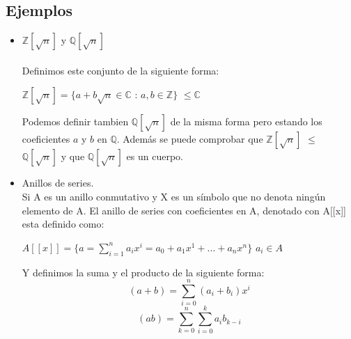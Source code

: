 \documentclass[11pt]{article}
\begin{document}
\subsection{Ejemplos}

\begin{itemize}
\item $\mathbb{Z}[\sqrt{n}]$ y $\mathbb{Q}[\sqrt{n}]$\\\\
Definimos este conjunto de la siguiente forma:\\
\begin{center}$\mathbb{Z}[\sqrt{n}] = \{a+b\sqrt{n} \in \mathbb{C}$ : $a,b \in \mathbb{Z} \}$ $\leq \mathbb{C}$\end{center}

Podemos definir tambien $\mathbb{Q}[\sqrt{n}]$ de la misma forma pero estando los coeficientes $a$ y $b$ en $\mathbb{Q}$. Además se puede comprobar que $\mathbb{Z}[\sqrt{n}]$ $\leq$ $\mathbb{Q}[\sqrt{n}]$ y que $\mathbb{Q}[\sqrt{n}]$ es un cuerpo.

\item Anillos de series.\\
Si A es un anillo conmutativo y X es un símbolo que no denota ningún elemento de A. El anillo de series con coeficientes en A, denotado con A[[x]] esta definido como:\begin{center}
$A[[x]] = \{a = \sum_{i=1}^{n}a_i x^i = a_0 + a_1 x^1 + ... + a_n x^n\}$ $a_i \in A$\end{center}
Y definimos la suma y el producto de la siguiente forma:\\
\[(a+b) = \sum_{i=0}^{n}(a_i+b_i)x^i\]\[ (ab) = \sum_{k=0}^n\sum_{i=0}^{k}a_ib_{k-i}\]
\end{itemize}
\end{document}
